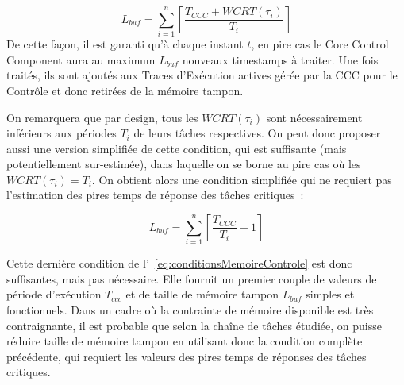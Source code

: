 \documentclass[french, a4paper, 11pt, twoside, pdftex]{StyleThese}
\begin{document}
    		\begin{equation}\label{eq:conditionsMemoireControle}
    			L_{buf} = \sum_{i=1}^{n}\left\lceil \frac{T_{CCC}+WCRT(\tau_i)}{T_i} \right\rceil
    		\end{equation}
    		De cette façon, il est garanti qu'à chaque instant $t$, en pire cas le Core Control Component aura au maximum $L_{buf}$ nouveaux timestamps à traiter. Une fois traités, ils sont ajoutés aux Traces d'Exécution actives gérée par la CCC pour le Contrôle et donc retirées de la mémoire tampon.
    		
    		On remarquera que par design, tous les $WCRT(\tau_i)$ sont nécessairement inférieurs aux périodes $T_i$ de leurs tâches respectives. On peut donc proposer aussi une version simplifiée de cette condition, qui est suffisante (mais potentiellement sur-estimée), dans laquelle on se borne au pire cas où les $ WCRT(\tau_i) = T_i $. On obtient alors une condition simplifiée qui ne requiert pas l'estimation des pires temps de réponse des tâches critiques~: 
    		
    		\begin{equation}\label{eq:conditionsMemoireSimplifiee}
    			L_{buf} = \sum_{i=1}^{n}\left\lceil \frac{T_{CCC}}{T_i} +1 \right\rceil
    		\end{equation}
    		
    		Cette dernière condition de l'~\autoref{eq:conditionsMemoireControle} est donc suffisantes, mais pas nécessaire. Elle fournit un premier couple de valeurs de période d'exécution $T_{ccc}$ et de taille de mémoire tampon $L_{buf}$ simples et fonctionnels. Dans un cadre où la contrainte de mémoire disponible est très contraignante, il est probable que selon la chaîne de tâches étudiée, on puisse réduire taille de mémoire tampon en utilisant donc la condition complète précédente, qui requiert les valeurs des pires temps de réponses des tâches critiques.
    		
    		
\end{document}
